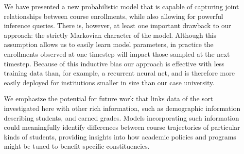 \documentclass{edm_template}
\begin{document}
We have presented a new probabilistic model that is capable of capturing joint relationships between course enrollments, while also allowing for powerful inference queries. There is, however, at least one important drawback to our approach: the strictly Markovian character of the model. Although this assumption allows us to easily learn model parameters, in practice the enrollments observed at one timestep will impact those sampled at the next timestep.  Because of this inductive bias our approach is effective with less training data than, for example, a recurrent neural net, and is therefore more easily deployed for institutions smaller in size than our case university.

We emphasize the potential for future work that links data of the sort investigated here with other rich information, such as demographic information describing students, and earned grades. Models incorporating such information could meaningfully identify differences between course trajectories of particular kinds of students, providing insights into how academic policies and programs might be tuned to benefit specific constituencies. 



 



\end{document}
